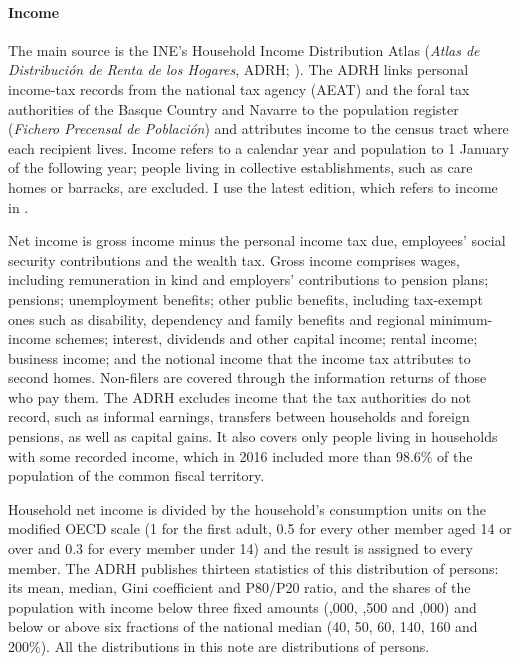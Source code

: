 
\paragraph{Income} The main source is the INE's Household Income Distribution Atlas (\textit{Atlas de Distribución de Renta de los Hogares}, ADRH; \citealt{ine2025adrh}). The ADRH links personal income-tax records from the national tax agency (AEAT) and the foral tax authorities of the Basque Country and Navarre to the population register (\textit{Fichero Precensal de Población}) and attributes income to the census tract where each recipient lives. Income refers to a calendar year and population to 1 January of the following year; people living in collective establishments, such as care homes or barracks, are excluded. I use the latest edition, which refers to income in \BaseYear{}.

Net income is gross income minus the personal income tax due, employees' social security contributions and the wealth tax. Gross income comprises wages, including remuneration in kind and employers' contributions to pension plans; pensions; unemployment benefits; other public benefits, including tax-exempt ones such as disability, dependency and family benefits and regional minimum-income schemes; interest, dividends and other capital income; rental income; business income; and the notional income that the income tax attributes to second homes. Non-filers are covered through the information returns of those who pay them. The ADRH excludes income that the tax authorities do not record, such as informal earnings, transfers between households and foreign pensions, as well as capital gains. It also covers only people living in households with some recorded income, which in 2016 included more than 98.6\% of the population of the common fiscal territory.

Household net income is divided by the household's consumption units on the modified OECD scale (1 for the first adult, 0.5 for every other member aged 14 or over and 0.3 for every member under 14) and the result is assigned to every member. The ADRH publishes thirteen statistics of this distribution of persons: its mean, median, Gini coefficient and P80/P20 ratio, and the shares of the population with income below three fixed amounts (,000, ,500 and ,000) and below or above six fractions of the national median (40, 50, 60, 140, 160 and 200\%). All the distributions in this note are distributions of persons.

